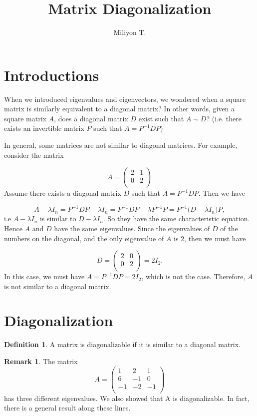 \documentclass[11pt]{article}
\theoremstyle{definition}
\newtheorem{defn}{Definition}
\newtheorem{rem}[thm]{Remark}
\theoremstyle{plain}
\begin{document}
\clearpage

\title{Matrix Diagonalization}
\author{Miliyon T.}
\maketitle
\section{Introductions}

When we introduced eigenvalues and eigenvectors, we wondered when a square matrix is similarly equivalent to a diagonal matrix? In other words, given a square matrix $A$, does a diagonal matrix $D$ exist such that $A \sim D$? (i.e. there exists an invertible matrix $P$ such that $A = P^{-1}DP$)

\medskip

\noindent In general, some matrices are not similar to diagonal matrices. For example, consider the matrix

\[ A =
\left(\begin{array}{rrr}
2&1\\
0&2\\
\end{array}\right)
\]
Assume there exists a diagonal matrix $D$ such that $A = P^{-1}DP$. Then we have

\[
A - \lambda I_n = P^{-1}DP - \lambda I_n = P^{-1}DP - \lambda P^{-1}P = P^{-1}\Big(D - \lambda I_n \Big)P,
\]
i.e $A - \lambda I_n$ is similar to $D - \lambda I_n$. So they have the same characteristic equation. Hence $A$ and $D$ have the same eigenvalues. Since the eigenvalues of $D$ of the numbers on the diagonal, and the only eigenvalue of $A$ is $2$, then we must have

\[
D = \left(\begin{array}{rrr} 2&0\\ 0&2\\ \end{array}\right) = 2I_2.
\]
In this case, we must have $A = P^{-1}DP = 2 I_2$, which is not the case. Therefore, $A$ is not similar to a diagonal matrix.

\section{Diagonalization}
\begin{defn}
A matrix is diagonalizable if it is similar to a diagonal matrix.
\end{defn}

\begin{rem}
The matrix
\[
A = \left(\begin{array}{rrr} 1&2&1\\ 6&-1&0\\ -1&-2&-1\\ \end{array}\right)
\]
has three different eigenvalues. We also showed that A is diagonalizable. In fact, there is a general result along these lines.
\end{rem}
\end{document}
